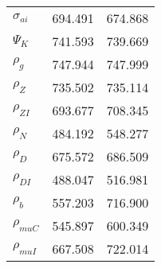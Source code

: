 \begin{center}
\begin{longtable}{lcc}
$ {\sigma_{ai}}        $	 & 	     694.491	 & 	     674.868 \\ 
$ {\Psi_{K}}           $	 & 	     741.593	 & 	     739.669 \\ 
$ {\rho_g}             $	 & 	     747.944	 & 	     747.999 \\ 
$ {\rho_Z}             $	 & 	     735.502	 & 	     735.114 \\ 
$ {\rho_{ZI}}          $	 & 	     693.677	 & 	     708.345 \\ 
$ {\rho_N}             $	 & 	     484.192	 & 	     548.277 \\ 
$ {\rho_D}             $	 & 	     675.572	 & 	     686.509 \\ 
$ {\rho_{DI}}          $	 & 	     488.047	 & 	     516.981 \\ 
$ {\rho_b}             $	 & 	     557.203	 & 	     716.900 \\ 
$ {\rho_{muC}}         $	 & 	     545.897	 & 	     600.349 \\ 
$ {\rho_{muI}}         $	 & 	     667.508	 & 	     722.014 \\ 
\end{longtable}
 \end{center}
